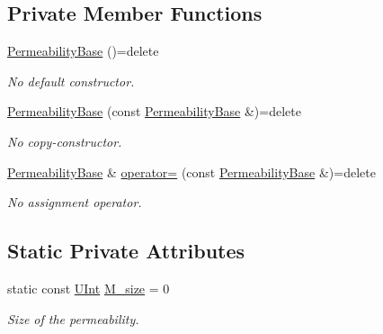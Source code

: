 \subsection*{Private Member Functions}
\begin{DoxyCompactItemize}
\item 
\hyperlink{classFVCode3D_1_1PermeabilityBase_ad0a13982b4a12932556083d1c05e50f2}{Permeability\+Base} ()=delete
\begin{DoxyCompactList}\small\item\em No default constructor. \end{DoxyCompactList}\item 
\hyperlink{classFVCode3D_1_1PermeabilityBase_a8d36d27dd831ce3b1f39edb0a570bf8c}{Permeability\+Base} (const \hyperlink{classFVCode3D_1_1PermeabilityBase}{Permeability\+Base} \&)=delete
\begin{DoxyCompactList}\small\item\em No copy-\/constructor. \end{DoxyCompactList}\item 
\hyperlink{classFVCode3D_1_1PermeabilityBase}{Permeability\+Base} \& \hyperlink{classFVCode3D_1_1PermeabilityBase_abc8abcfca62e9520d74dd09dd324bd9c}{operator=} (const \hyperlink{classFVCode3D_1_1PermeabilityBase}{Permeability\+Base} \&)=delete
\begin{DoxyCompactList}\small\item\em No assignment operator. \end{DoxyCompactList}\end{DoxyCompactItemize}
\subsection*{Static Private Attributes}
\begin{DoxyCompactItemize}
\item 
static const \hyperlink{namespaceFVCode3D_a4bf7e328c75d0fd504050d040ebe9eda}{U\+Int} \hyperlink{classFVCode3D_1_1PermeabilityBase_a5914ac070cdad89b5b6f0133a0ee3ba5}{M\+\_\+size} = 0
\begin{DoxyCompactList}\small\item\em Size of the permeability. \end{DoxyCompactList}\end{DoxyCompactItemize}
